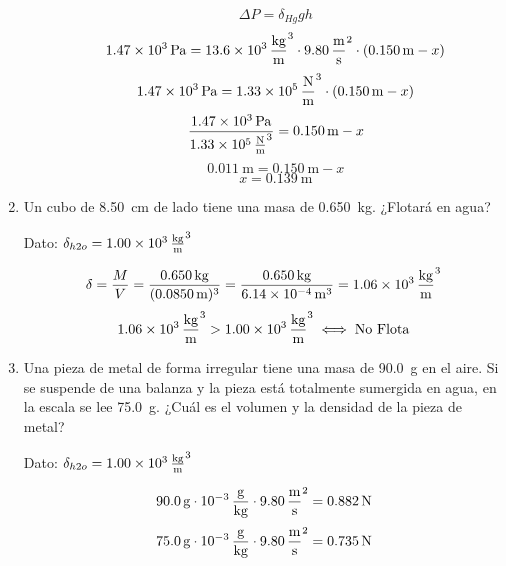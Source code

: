 \documentclass[Física - Práctica.root.tex]{subfiles}
\begin{document}
\begin{enumerate}
\begin{enumerate}
                \[\Delta P=\delta_{Hg}gh\]
                \[\SI{1,47e3}{\pascal}=\SI{13,6e3}{\kilogram\over\meter\cubed}\cdot\SI{9,80}{\meter\over\second\squared}\cdot(\SI{0,150}{\meter}-x)\]
                \[\SI{1,47e3}{\pascal}=\SI{1,33e5}{\newton\over\meter\cubed}\cdot(\SI{0,150}{\meter}-x)\]
                \[\frac{\SI{1,47e3}{\pascal}}{\SI{1,33e5}{\newton\over\meter\cubed}}=\SI{0,150}{\meter}-x\]
                \[\SI{0,011}{\meter}=\SI{0,150}{\meter}-x\]
                \[x=\boxed{\SI{0,139}{\meter}}\]
        \end{enumerate}

  \item Un cubo de \SI{8,50}{\cm} de lado tiene una masa de \SI{0,650}{\kilogram}. ¿Flotará en agua?

        Dato: $\delta_{h2o}=\SI{1,00e3}{\kilogram\over\meter\cubed}$

        \[
          \delta=\frac{M}{V}
          =\frac{\SI{0,650}{\kilogram}}{(\SI{0,0850}{\meter})^3}
          =\frac{\SI{0,650}{\kilogram}}{\SI{6,14e-4}{\meter\cubed}}
          =\SI{1,06e3}{\kilogram\over\meter\cubed}
        \]
        \[\SI{1,06e3}{\kilogram\over\meter\cubed}>\SI{1,00e3}{\kilogram\over\meter\cubed}\iff\text{No Flota}\]

        \newpage

  \item Una pieza de metal de forma irregular tiene una masa de \SI{90,0}{\gram} en el aire. Si se suspende de una balanza y la pieza está totalmente sumergida en agua, en la escala se lee \SI{75,0}{\gram}. ¿Cuál es el volumen y la densidad de la pieza de metal?

        Dato: $\delta_{h2o}=\SI{1,00e3}{\kilogram\over\meter\cubed}$

        \begin{multicols}{2}
          \begin{center}
          \end{center}

          \[\SI{90,0}{\gram}\cdot\SI{e-3}{\gram\over\kilogram}\cdot\SI{9,80}{\meter\over\second\squared}=\SI{0,882}{\newton}\]
          \[\SI{75,0}{\gram}\cdot\SI{e-3}{\gram\over\kilogram}\cdot\SI{9,80}{\meter\over\second\squared}=\SI{0,735}{\newton}\]


\end{multicols}
\end{enumerate}
\end{document}
